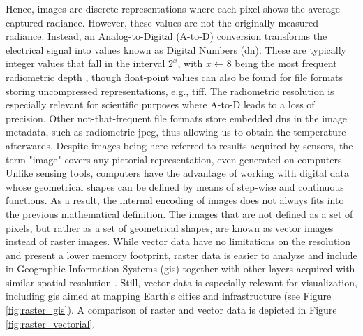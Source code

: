 Hence, images are discrete representations where each pixel shows the average captured radiance. However, these values are not the originally measured radiance. Instead, an Analog-to-Digital (A-to-D) conversion transforms the electrical signal into values known as Digital Numbers (\acrshort{dn}). These are typically integer values that fall in the interval $2^x$, with $x \gets 8$ being the most frequent radiometric depth \cite{navulur_multispectral_2006}, though float-point values can also be found for file formats storing uncompressed representations, e.g., \acrshort{tiff}. The radiometric resolution is especially relevant for scientific purposes where A-to-D leads to a loss of precision. Other not-that-frequent file formats store embedded \acrshort{dn}s in the image metadata, such as radiometric \acrshort{jpeg}, thus allowing us to obtain the temperature afterwards. Despite images being here referred to results acquired by sensors, the term "image" covers any pictorial representation, even generated on computers. Unlike sensing tools, computers have the advantage of working with digital data whose geometrical shapes can be defined by means of step-wise and continuous functions. As a result, the internal encoding of images does not always fits into the previous mathematical definition. The images that are not defined as a set of pixels, but rather as a set of geometrical shapes, are known as vector images instead of raster images. While vector data have no limitations on the resolution and present a lower memory footprint, raster data is easier to analyze and include in Geographic Information Systems (\acrshort{gis}) together with other layers acquired with similar spatial resolution \cite{lillesand_remote_2015}. Still, vector data is especially relevant for visualization, including \acrshort{gis} aimed at mapping Earth's cities and infrastructure (see Figure \ref{fig:raster_gis}). A comparison of raster and vector data is depicted in Figure \ref{fig:raster_vectorial}.
